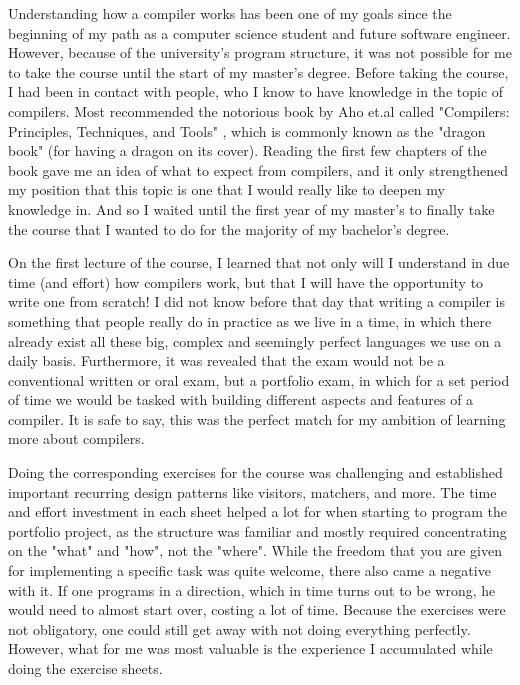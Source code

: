 Understanding how a compiler works has been one of my goals
since the beginning of my path as a computer science student
and future software engineer.
However, because of the university's program structure, it was not possible
for me to take the course until the start of my master's degree.
Before taking the course, I had been in contact with people, who I know to have
knowledge in the topic of compilers. Most recommended the notorious 
book by Aho et.\@ al called "Compilers: Principles, Techniques, and Tools" \cite{dragonBook},
which is commonly known as the "dragon book" (for having a dragon on its cover).
Reading the first few chapters of the book gave me an idea of
what to expect from compilers, and it only strengthened my position that
this topic is one that I would really like to deepen my knowledge in.
And so I waited until the first year of my master's to finally take the
course that I wanted to do for the majority of my bachelor's degree.

On the first lecture of the course, I learned that not only will I understand 
in due time (and effort) how compilers work, but
that I will have the opportunity to write one from scratch!
I did not know before that day that writing a compiler is something
that people really do in practice as we live in a time, in which 
there already exist all these big, complex and seemingly perfect languages
we use on a daily basis. Furthermore, it was revealed that
the exam would not be a conventional written or oral exam, but a portfolio exam,
in which for a set period of time we would be tasked with building
different aspects and features of a compiler.
It is safe to say, this was the perfect match for my ambition of learning more about compilers.

Doing the corresponding exercises for the course was challenging and 
established important recurring design patterns like visitors, matchers, and more.
The time and effort investment in each sheet helped a lot 
for when starting to program the portfolio project, as the structure was familiar and mostly
required concentrating on the "what" and "how", not the "where".
While the freedom that you are given for implementing a specific task was
quite welcome, there also came a negative with it.
If one programs in a direction, which in time turns out to be wrong, he would need to
almost start over, costing a lot of time. Because the exercises were not
obligatory, one could still get away with not doing everything perfectly.
However, what for me was most valuable is the experience I accumulated
while doing the exercise sheets.

